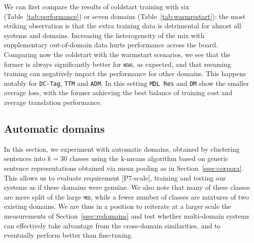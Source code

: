 \documentclass[11pt,a4paper]{article}
\newcommand{\fyTodo}[1]{\Todo[FY:]{\textcolor{orange}{#1}}}
\newcommand{\fyDone}[1]{\done[FY]\Todo[FY:]{\textcolor{orange}{#1}}}
\newcommand{\domain}[1]{\texttt{\textsc{#1}}}
\newcommand{\system}[1]{\texttt{{#1}}}
\begin{document}
We can first compare the results of coldstart training with six (Table~\ref{tab:performance}) or seven domains (Table~\ref{tab:warmrestart}): the most striking observation is that the extra training data is detrimental for almost all systems and domains\fyDone{is this significant ?}. Increasing the heterogeneity of the mix with supplementary out-of-domain data hurts performance across the board.
Comparing now the coldstart with the warmstart scenarios, we see that the former is always significantly better for \domain{news}, as expected, and that resuming training can negatively impact the performance for other domains. This happens notably for \system{DC-Tag}, \system{TTM} and \system{ADM}. In this setting \system{MDL Res} and \system{DM} show the smaller average loss, with the former achieving the best balance of training cost and average translation performance.%


\subsection{Automatic domains \label{ssec:autodomains}}
In this section, we experiment with automatic domains, obtained by clustering sentences into $k=30$ classes using the k-means algorithm based on generic sentence representations obtained via mean pooling as in Section~\ref{ssec:corpora}. This allows us to evaluate requirement [P7-scale], training and testing our systems as if these domains were genuine. We also note that many of these classes are mere split of the large \domain{med}, while a fewer number of classes are mixtures of two existing domains. We are thus in a position to reiterate at a larger scale the measurements of Section~\ref{ssec:redomains} and test whether multi-domain systems can effectively take advantage from the cross-domain similarities, and to eventually perform better than fine-tuning.
\end{document}
